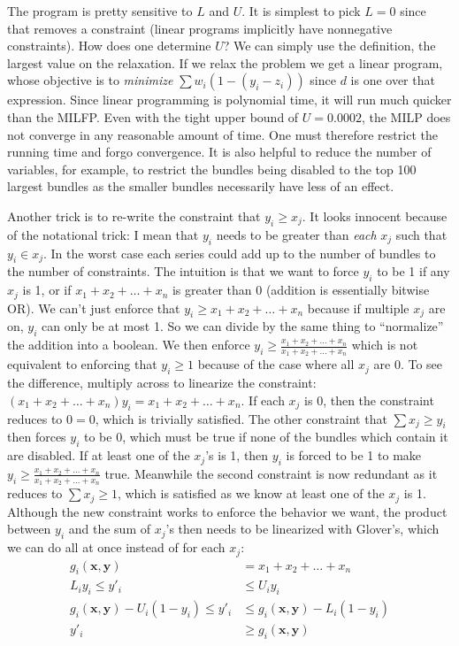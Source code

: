 \documentclass[11pt, oneside]{article}
\theoremstyle{plain}
\theoremstyle{definition}
\begin{document}
The program is pretty sensitive to \( L \) and \( U \). It is simplest to pick
\( L = 0 \) since that removes a constraint (linear programs implicitly have
nonnegative constraints). How does one determine \( U \)? We can simply use
the definition, the largest value on the relaxation. If we relax the problem
we get a linear program, whose objective is to \textit{minimize} \( \sum w_i
(1 - (y_i - z_i)) \) since \( d \) is one over that expression. Since linear
programming is polynomial time, it will run much quicker than the MILFP. Even
with the tight upper bound of \( U = 0.0002 \), the MILP does not converge in
any reasonable amount of time. One must therefore restrict the running time
and forgo convergence. It is also helpful to reduce the number of variables,
for example, to restrict the bundles being disabled to the top 100 largest
bundles as the smaller bundles necessarily have less of an effect.

Another trick is to re-write the constraint that \( y_i \geq x_j \). It looks
innocent because of the notational trick: I mean that \( y_i \) needs to be
greater than \textit{each} \( x_j \) such that \( y_i \in x_j \). In the
worst case each series could add up to the number of bundles to the number of
constraints. The intuition is that we want to force \( y_i \) to be 1 if any \(
x_j \) is 1, or if \( x_1 + x_2 + \dots + x_n \) is greater than 0 (addition
is essentially bitwise OR). We can't just enforce that \( y_i \geq x_1 + x_2 +
\dots + x_n \) because if multiple \( x_j \) are on, \( y_i \) can only be at
most 1. So we can divide by the same thing to \enquote{normalize} the addition
into a boolean. We then enforce \( y_i \geq \frac{x_1 + x_2 + \dots + x_n}{x_1
+ x_2 + \dots + x_n} \) which is not equivalent to enforcing that \( y_i \geq
1 \) because of the case where all \( x_j \) are 0. To see the difference,
multiply across to linearize the constraint: \( (x_1 + x_2 + \dots + x_n) y_i =
x_1 + x_2 + \dots + x_n \). If each \( x_j \) is 0, then the constraint reduces
to \( 0 = 0 \), which is trivially satisfied. The other constraint that \( \sum
x_j \geq y_i \) then forces \( y_i \) to be 0, which must be true if none of
the bundles which contain it are disabled. If at least one of the \( x_j \)'s
is 1, then \( y_i \) is forced to be 1 to make \( y_i \geq \frac{x_1 + x_2 +
\dots + x_n}{x_1 + x_2 + \dots + x_n} \) true. Meanwhile the second constraint
is now redundant as it reduces to \( \sum x_j \geq 1 \), which is satisfied as
we know at least one of the \( x_j \) is 1. Although the new constraint works
to enforce the behavior we want, the product between \( y_i \) and the sum of
\( x_j \)'s then needs to be linearized with Glover's, which we can do all at
once instead of for each \( x_j \):
\begin{align}
  g_i(\bm{x}, \bm{y}) &= x_1 + x_2 + \dots + x_n \\  
  L_i y_i \leq y'_i &\leq U_i y_i                     \label{eq:glover1} \\
  g_i(\bm{x}, \bm{y}) - U_i (1 - y_i) \leq y'_i &\leq 
  g_i(\bm{x}, \bm{y}) - L_i (1 - y_i)                 \label{eq:glover2} \\ 
  y'_i &\geq g_i(\bm{x}, \bm{y})                      \label{eq:disable}
\end{align}
\end{document}
